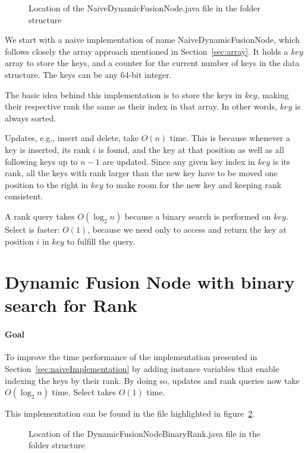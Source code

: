 \begin{figure}[H]
\caption{Location of the {\ttfamily NaiveDynamicFusionNode.java} file in the folder structure}
\label{fig:NaiveDynamicFusionNodeTree}
\end{figure}

We start with a naive implementation of name {\ttfamily NaiveDynamicFusionNode}, which follows closely the array approach mentioned in Section~\ref{sec:array}.
It holds a $key$ array to store the keys, and a counter for the current number of keys in the data structure. The keys can be any 64-bit integer.

The basic idea behind this implementation is to store the keys in $key$, making their respective rank the same as their index in that array. In other words, $key$ is always sorted.

Updates, e.g., insert and delete, take $O(n)$ time. This is because whenever a key is inserted, its rank $i$ is found, and the key at that position as well as all following keys up to $n-1$ are updated. Since any given key index in $key$ is its rank, all the keys with rank larger than the new key have to be moved one position to the right in $key$ to make room for the new key and keeping rank consistent.

A rank query takes $O(\log_2 n)$ because a binary search is performed on $key$. Select is faster: $O(1)$, because we need only to access and return the key at position $i$ in $key$ to fulfill the query.

\newpage
\section{Dynamic Fusion Node with binary search for Rank} \label{sec:DynamicFusionNodeBinaryRank}

\paragraph*{Goal}
To improve the time performance of the implementation presented in Section~\ref{sec:naiveImplementation} by adding instance variables that enable indexing the keys by their rank. By doing so, updates and rank queries now take $O(\log_2 n)$ time. Select takes $O(1)$ time.

This implementation can be found in the file highlighted in figure~\ref{fig:DynamicFusionNodeBinaryRankTree}.
\begin{figure}[H]
\caption{Location of the {\ttfamily DynamicFusionNodeBinaryRank.java} file in the folder structure}
\label{fig:DynamicFusionNodeBinaryRankTree}
\end{figure}

